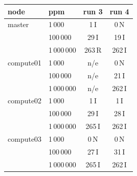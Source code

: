 \begin{tabular}{@{}llcc@{}}
\toprule
node & ppm & run 3 & run 4 \\
\midrule
master & 1\,000 & 1\,I & 0\,N \\
 & 100\,000 & 29\,I & 19\,I \\
 & 1\,000\,000 & 263\,R & 262\,I \\
\addlinespace[2pt]
compute01 & 1\,000 & n/e & 0\,N \\
 & 100\,000 & n/e & 21\,I \\
 & 1\,000\,000 & n/e & 262\,I \\
\addlinespace[2pt]
compute02 & 1\,000 & 1\,I & 1\,I \\
 & 100\,000 & 29\,I & 28\,I \\
 & 1\,000\,000 & 265\,I & 262\,I \\
\addlinespace[2pt]
compute03 & 1\,000 & 0\,N & 0\,N \\
 & 100\,000 & 27\,I & 31\,I \\
 & 1\,000\,000 & 265\,I & 262\,I \\
\bottomrule
\end{tabular}
